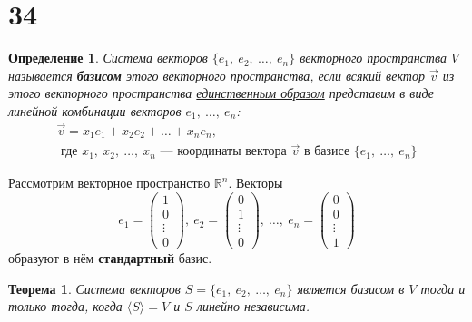 \documentclass[a4paper,12pt]{article}
\newtheorem*{definition}{Определение}
\newtheorem*{theorem}{Теорема}
\begin{document}
	\section*{34}
	\begin{definition}
		Система векторов $\{e_1,\ e_2,\ \ldots,\ e_n\}$ векторного пространства $V$ называется \textbf{базисом} этого векторного пространства, если всякий вектор $\vec{v}$ из этого векторного пространства \underline{единственным образом} представим в виде линейной комбинации векторов ${e_{1},\ \ldots,\ e_{n}}$:
		\begin{gather*}
		\vec{v} = x_1 e_1 + x_2 e_2 + \ldots + x_n e_n,\\ \text{ где $x_1,\ x_2,\ \ldots,\ x_n$ — }\textbf{координаты вектора $\vec{v}$ в базисе $\{e_1,\ \ldots,\ e_n\}$}
		\end{gather*}
	\end{definition}
	Рассмотрим векторное пространство $\mathbb{R}^n$. Векторы
	\[e_1 = \begin{pmatrix} 1 \\ 0 \\ \vdots \\ 0 \end{pmatrix},\ 
	e_2 = \begin{pmatrix} 0 \\ 1 \\ \vdots \\ 0 \end{pmatrix}
	,\ \ldots,\ 
	e_n = \begin{pmatrix} 0 \\ 0 \\ \vdots \\ 1 \end{pmatrix}\]
	образуют в нём \textbf{стандартный} базис.
	\begin{theorem}
		Система векторов $S = \{e_1,\ e_2,\ \ldots,\ e_n\}$ является базисом в $V$ тогда и только тогда, когда $\langle S \rangle = V$ и $S$ линейно независима.
	\end{theorem}
\end{document}

